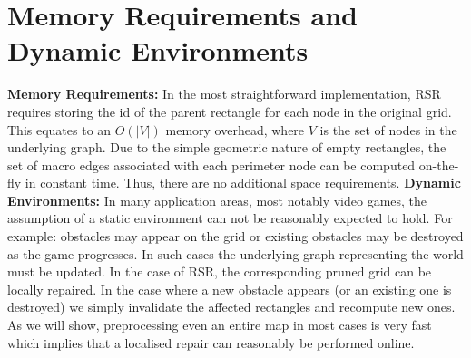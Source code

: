 \section{Memory Requirements and Dynamic Environments}
\label{sec:memory}
\textbf{Memory Requirements: }
In the most straightforward implementation, RSR requires storing the id of the
parent rectangle for each node in the original grid. 
This equates to an $O(|V|)$ memory overhead, where $V$ is the set of nodes
in the underlying graph.
Due to the simple geometric nature of empty rectangles, the set of macro
edges associated with each perimeter node can be computed on-the-fly in
constant time. Thus, there are no additional space requirements.
\newline \noindent
\textbf{Dynamic Environments: }
In many application areas, most notably video games, the assumption of a static 
environment can not be reasonably expected to hold.
For example: obstacles may appear on the grid or existing obstacles may be
destroyed as the game progresses.
In such cases the underlying graph representing the world must be updated.
In the case of RSR, the corresponding pruned grid can be locally repaired.
In the case where a new obstacle appears (or an existing one is destroyed) 
we simply invalidate the affected rectangles and recompute new ones.
As we will show, preprocessing even an entire map in most cases is very fast
which implies that a localised repair can reasonably be performed
online.
